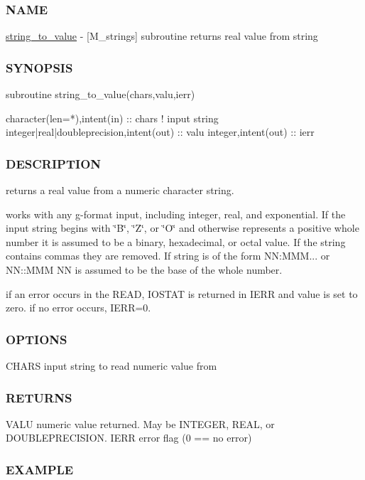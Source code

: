 \subsubsection*{N\+A\+ME}

\hyperlink{interfacem__strings_1_1string__to__value}{string\+\_\+to\+\_\+value} -\/ \mbox{[}M\+\_\+strings\mbox{]} subroutine returns real value from string 

\subsubsection*{S\+Y\+N\+O\+P\+S\+IS}

\begin{DoxyVerb}subroutine string_to_value(chars,valu,ierr)

 character(len=*),intent(in) :: chars   ! input string
 integer|real|doubleprecision,intent(out)         :: valu
 integer,intent(out)         :: ierr
\end{DoxyVerb}


\subsubsection*{D\+E\+S\+C\+R\+I\+P\+T\+I\+ON}

returns a real value from a numeric character string.

works with any g-\/format input, including integer, real, and exponential. If the input string begins with \char`\"{}\+B\char`\"{}, \char`\"{}\+Z\char`\"{}, or \char`\"{}\+O\char`\"{} and otherwise represents a positive whole number it is assumed to be a binary, hexadecimal, or octal value. If the string contains commas they are removed. If string is of the form NN\+:M\+MM... or N\+N\+::\+M\+MM NN is assumed to be the base of the whole number.

if an error occurs in the R\+E\+AD, I\+O\+S\+T\+AT is returned in I\+E\+RR and value is set to zero. if no error occurs, I\+E\+RR=0. \subsubsection*{O\+P\+T\+I\+O\+NS}

C\+H\+A\+RS input string to read numeric value from \subsubsection*{R\+E\+T\+U\+R\+NS}

V\+A\+LU numeric value returned. May be I\+N\+T\+E\+G\+ER, R\+E\+AL, or D\+O\+U\+B\+L\+E\+P\+R\+E\+C\+I\+S\+I\+ON. I\+E\+RR error flag (0 == no error) \subsubsection*{E\+X\+A\+M\+P\+LE}

